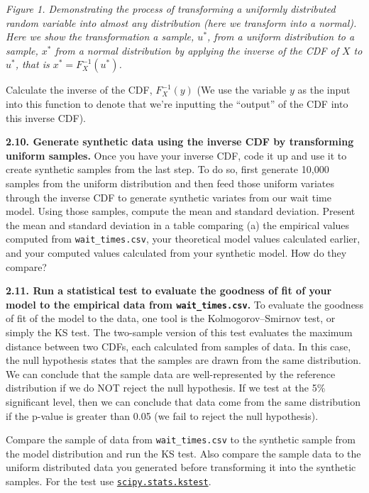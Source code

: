 \documentclass[
  letterpaper,
  DIV=11,
  numbers=noendperiod]{scrartcl}
\begin{document}
\emph{Figure 1. Demonstrating the process of transforming a uniformly
distributed random variable into almost any distribution (here we
transform into a normal). Here we show the transformation a sample,
\(u^{\ast}\), from a uniform distribution to a sample, \(x^{\ast}\) from
a normal distribution by applying the inverse of the CDF of \(X\) to
\(u^{\ast}\), that is \(x^{\ast} = F_X^{-1}(u^{\ast})\).}

Calculate the inverse of the CDF, \(F_X^{-1}(y)\) (We use the variable
\(y\) as the input into this function to denote that we're inputting the
``output'' of the CDF into this inverse CDF).

\textbf{2.10. Generate synthetic data using the inverse CDF by
transforming uniform samples.} Once you have your inverse CDF, code it
up and use it to create synthetic samples from the last step. To do so,
first generate 10,000 samples from the uniform distribution and then
feed those uniform variates through the inverse CDF to generate
synthetic variates from our wait time model. Using those samples,
compute the mean and standard deviation. Present the mean and standard
deviation in a table comparing (a) the empirical values computed from
\texttt{wait\_times.csv}, your theoretical model values calculated
earlier, and your computed values calculated from your synthetic model.
How do they compare?

\textbf{2.11. Run a statistical test to evaluate the goodness of fit of
your model to the empirical data from \texttt{wait\_times.csv}.} To
evaluate the goodness of fit of the model to the data, one tool is the
Kolmogorov--Smirnov test, or simply the KS test. The two-sample version
of this test evaluates the maximum distance between two CDFs, each
calculated from samples of data. In this case, the null hypothesis
states that the samples are drawn from the same distribution. We can
conclude that the sample data are well-represented by the reference
distribution if we do NOT reject the null hypothesis. If we test at the
5\% significant level, then we can conclude that data come from the same
distribution if the p-value is greater than 0.05 (we fail to reject the
null hypothesis).

Compare the sample of data from \texttt{wait\_times.csv} to the
synthetic sample from the model distribution and run the KS test. Also
compare the sample data to the uniform distributed data you generated
before transforming it into the synthetic samples. For the test use
\href{https://docs.scipy.org/doc/scipy/reference/generated/scipy.stats.kstest.html}{\texttt{scipy.stats.kstest}}.
\end{document}
